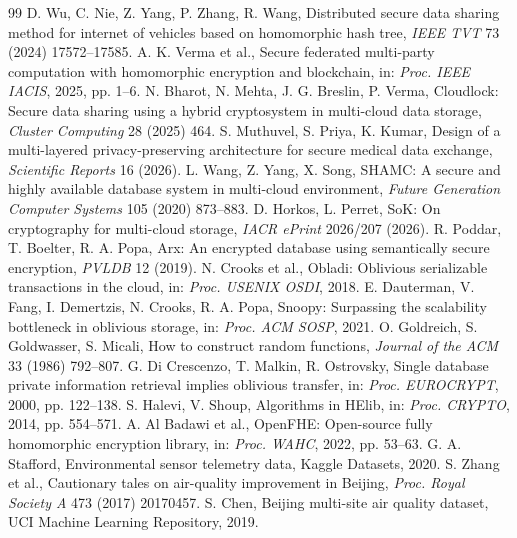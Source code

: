 \documentclass[11pt,a4paper]{article}
\begin{document}
\begin{thebibliography}{99}
 D. Wu, C. Nie, Z. Yang, P. Zhang, R. Wang, Distributed secure data sharing method for internet of vehicles based on homomorphic hash tree, \textit{IEEE TVT} 73 (2024) 17572--17585.
 A. K. Verma et al., Secure federated multi-party computation with homomorphic encryption and blockchain, in: \textit{Proc. IEEE IACIS}, 2025, pp. 1--6.
 N. Bharot, N. Mehta, J. G. Breslin, P. Verma, Cloudlock: Secure data sharing using a hybrid cryptosystem in multi-cloud data storage, \textit{Cluster Computing} 28 (2025) 464.
 S. Muthuvel, S. Priya, K. Kumar, Design of a multi-layered privacy-preserving architecture for secure medical data exchange, \textit{Scientific Reports} 16 (2026).
 L. Wang, Z. Yang, X. Song, SHAMC: A secure and highly available database system in multi-cloud environment, \textit{Future Generation Computer Systems} 105 (2020) 873--883.
 D. Horkos, L. Perret, SoK: On cryptography for multi-cloud storage, \textit{IACR ePrint} 2026/207 (2026).
 R. Poddar, T. Boelter, R. A. Popa, Arx: An encrypted database using semantically secure encryption, \textit{PVLDB} 12 (2019).
 N. Crooks et al., Obladi: Oblivious serializable transactions in the cloud, in: \textit{Proc. USENIX OSDI}, 2018.
 E. Dauterman, V. Fang, I. Demertzis, N. Crooks, R. A. Popa, Snoopy: Surpassing the scalability bottleneck in oblivious storage, in: \textit{Proc. ACM SOSP}, 2021.
 O. Goldreich, S. Goldwasser, S. Micali, How to construct random functions, \textit{Journal of the ACM} 33 (1986) 792--807.
 G. Di Crescenzo, T. Malkin, R. Ostrovsky, Single database private information retrieval implies oblivious transfer, in: \textit{Proc. EUROCRYPT}, 2000, pp. 122--138.
 S. Halevi, V. Shoup, Algorithms in HElib, in: \textit{Proc. CRYPTO}, 2014, pp. 554--571.
 A. Al Badawi et al., OpenFHE: Open-source fully homomorphic encryption library, in: \textit{Proc. WAHC}, 2022, pp. 53--63.
 G. A. Stafford, Environmental sensor telemetry data, Kaggle Datasets, 2020.
 S. Zhang et al., Cautionary tales on air-quality improvement in Beijing, \textit{Proc. Royal Society A} 473 (2017) 20170457.
 S. Chen, Beijing multi-site air quality dataset, UCI Machine Learning Repository, 2019.
\end{thebibliography}
\end{document}
